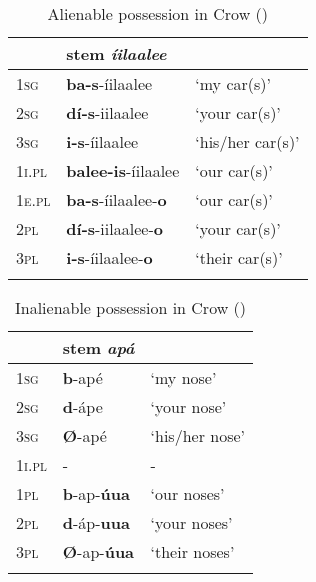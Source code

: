 \documentclass[output=paper]{LSP/langsci}
\begin{document}
\begin{table}
\caption{Alienable possession in Crow (\citealt[53]{Graczyk2007})} \label{crowalienablepossession}
\begin{tabular}{ l l l}
\lsptoprule
& stem \textit{íilaalee} & \\
\midrule 	
\textsc{1sg} & \textbf{ba-s}-íilaalee	& `my car(s)' \\
 
\textsc{2sg} & \textbf{dí-s}-iilaalee & `your car(s)' \\
 
\textsc{3sg} & \textbf{i-s}-íilaalee & `his/her car(s)' \\
 
\textsc{1i.pl} & \textbf{balee-is}-íilaalee & `our car(s)' \\
 
\textsc{1e.pl} & \textbf{ba-s}-íilaalee-\textbf{o} & `our car(s)' \\
 
\textsc{2pl} & \textbf{dí-s}-iilaalee-\textbf{o} & `your car(s)' \\
 
\textsc{3pl} & \textbf{i-s}-íilaalee-\textbf{o} & `their car(s)' \\
\lspbottomrule
\end{tabular}
\end{table}

\begin{table}
\caption{Inalienable possession in Crow (\citealt[52]{Graczyk2007})} \label{crowinalienablepossession}
\begin{tabular}{ l l l }
\lsptoprule
& stem \textit{apá}  & \\
\midrule	
\textsc{1sg} & \textbf{b}-apé & `my nose' \\
 
\textsc{2sg} & \textbf{d}-ápe	 & `your nose' \\
 
\textsc{3sg} & \textbf{Ø}-apé & `his/her nose' \\
 
\textsc{1i.pl}	& -	& - \\
 
\textsc{1pl} & \textbf{b}-ap-\textbf{úua}	& `our noses' \\
 
\textsc{2pl} & \textbf{d}-áp-\textbf{uua}	& `your noses' \\
 
\textsc{3pl} & \textbf{Ø}-ap-\textbf{úua}	& `their noses' \\
\lspbottomrule
\end{tabular}
\end{table}
\end{document}
